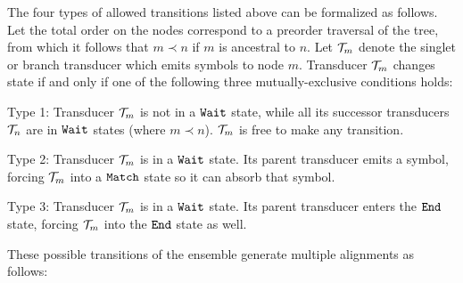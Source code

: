 \documentclass[10pt]{article}
\begin{document}
The four types of allowed transitions listed above can be formalized
as follows.
Let the total order on the nodes correspond to a preorder traversal of
the tree, from which it follows that $m \prec n$ if $m$ is ancestral to $n$.
Let ${\cal T}_m$ denote the singlet or branch transducer which emits symbols to node $m$.
Transducer ${\cal T}_m$ changes state if and only if one of the
following three mutually-exclusive conditions holds:
\begin{description}
\item{Type 1:} Transducer ${\cal T}_m$ is not in a $\mathtt{Wait}$ state,
  while all its successor transducers ${\cal T}_n$ are in $\mathtt{Wait}$
  states (where $m \prec n$).  ${\cal T}_m$ is free to make any transition.
\item{Type 2:} Transducer ${\cal T}_m$ is in a $\mathtt{Wait}$ state. Its parent transducer emits a symbol, forcing ${\cal T}_m$ into a $\mathtt{Match}$ state so it can absorb that symbol.
\item{Type 3:} Transducer ${\cal T}_m$ is in a $\mathtt{Wait}$ state. Its parent transducer enters the $\mathtt{End}$ state, forcing ${\cal T}_m$ into the $\mathtt{End}$ state as well.
\end{description}
These possible transitions of the ensemble generate multiple alignments as follows:
\end{document}
